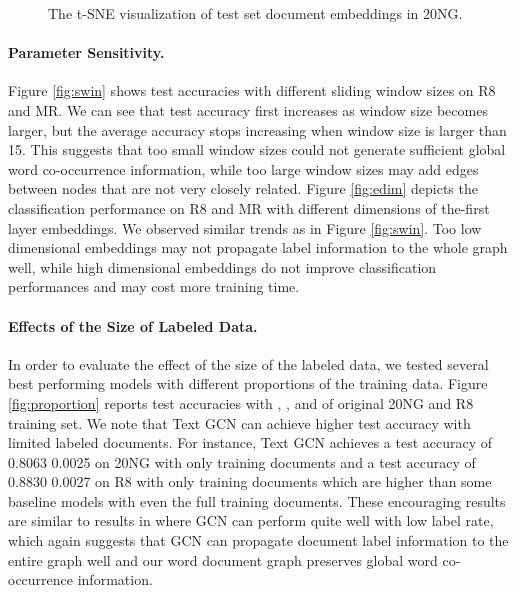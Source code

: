 \documentclass[letterpaper]{article} \usepackage{aaai19}  \usepackage{times}  \usepackage{helvet}  \usepackage{courier}  \usepackage{url}  \usepackage{graphicx}  \frenchspacing  \usepackage{amsmath}
\begin{document}
\begin{figure}[t]
\centering
{}


\caption{The t-SNE visualization of test set document embeddings in 20NG.}
\label{fig:doc2vec}
\end{figure}


\paragraph{Parameter Sensitivity.} Figure \ref{fig:swin} shows test accuracies with different sliding window sizes on R8 and MR. We can see that test accuracy first increases as window size becomes larger, but the average accuracy stops increasing when window size is larger than 15. This suggests that too small window sizes could not generate sufficient global word co-occurrence information, while too large window sizes may add edges between nodes that are not very closely related. Figure \ref{fig:edim} depicts the classification performance on R8 and MR with different dimensions of the-first layer embeddings. We observed similar trends as in Figure \ref{fig:swin}. Too low dimensional embeddings may not propagate label information to the whole graph well, while high dimensional embeddings do not improve classification performances and may cost more training time.




\paragraph{Effects of the Size of Labeled Data.} 
 
In order to evaluate the effect of the size of the labeled data, we tested several best performing models with different proportions of the training data. Figure \ref{fig:proportion} reports test accuracies with , ,  and  of original 20NG and R8 training set. We note that Text GCN can achieve higher test accuracy with limited labeled documents. For instance, Text GCN achieves a test accuracy of 0.8063  0.0025 on 20NG with only  training documents and a test accuracy of 0.8830  0.0027 on R8 with only  training documents which are higher than some baseline models with even the full training documents. These encouraging results are similar to results in \cite{kipf2017semi} where GCN can perform quite well with low label rate, which again suggests that GCN can propagate document label information to the entire graph well and our word document graph preserves global word co-occurrence information. 
\end{document}
